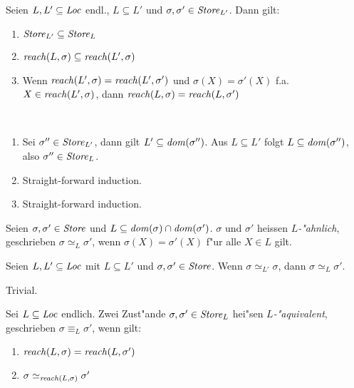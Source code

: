\documentclass[12pt,a4paper,bigheadings]{scrartcl}
\newcommand{\reach}{\name{reach}}
\begin{document}
\begin{lemma} \label{lemma:Store_L_und_reach}
  Seien $L,L'\subseteq{\text{\it Loc\/}}$ endl., $L \subseteq L'$ und $\sigma,\sigma'\in{\text{\it Store\/}}_{L'}$. Dann gilt:
  \begin{enumerate}
    \item ${\text{\it Store\/}}_{L'} \subseteq {\text{\it Store\/}}_{L}$
    \item $\reach(L,\sigma) \subseteq \reach(L',\sigma)$
    \item Wenn $\reach(L',\sigma) = \reach(L',\sigma')$ und $\sigma(X) = \sigma'(X)$ f.a.
          $X\in\reach(L',\sigma)$, dann $\reach(L,\sigma) = \reach(L,\sigma')$
  \end{enumerate}
\end{lemma}

\begin{beweis} \
  \begin{enumerate}
    \item Sei $\sigma''\in{\text{\it Store\/}}_{L'}$, dann gilt $L' \subseteq {\text{\it dom\/}}(\sigma'')$. Aus $L \subseteq L'$ folgt
          $L\subseteq{\text{\it dom\/}}(\sigma'')$, also $\sigma''\in{\text{\it Store\/}}_L$.
    \item Straight-forward induction.
    \item Straight-forward induction.
  \end{enumerate}
\end{beweis}

\begin{definition}[$L$-"Ahnlichkeit]
  Seien $\sigma,\sigma'\in{\text{\it Store\/}}$ und $L \subseteq {\text{\it dom\/}}(\sigma) \cap {\text{\it dom\/}}(\sigma')$. $\sigma$ und $\sigma'$
  heissen {\em $L$-"ahnlich}, geschrieben $\sigma \simeq_L \sigma'$, wenn $\sigma(X) = \sigma'(X)$ f"ur
  alle $X \in L$ gilt.
\end{definition}

\begin{lemma} \label{lemma:L_Aehnlichkeit}
  Seien $L,L'\subseteq{\text{\it Loc\/}}$ mit $L \subseteq L'$ und $\sigma,\sigma'\in{\text{\it Store\/}}$. Wenn $\sigma \simeq_{L'} \sigma$,
  dann $\sigma \simeq_L \sigma'$.
\end{lemma}

\begin{beweis}
  Trivial.
\end{beweis}

\begin{definition}[$L$-"Aquivalenz]
  Sei $L \subseteq {\text{\it Loc\/}}$ endlich. Zwei Zust"ande $\sigma,\sigma'\in{\text{\it Store\/}}_L$ hei"sen {\em $L$-"aquivalent}, geschrieben
  $\sigma \equiv_L \sigma'$, wenn gilt:
  \begin{enumerate}
    \item $\reach(L,\sigma) = \reach(L,\sigma')$
    \item $\sigma \simeq_{\reach(L,\sigma)} \sigma'$
  \end{enumerate}
\end{definition}
\end{document}
